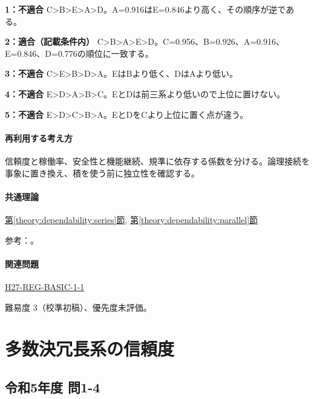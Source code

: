 \noindent\textbf{1：不適合} C>B>E>A>D。A=\allowbreak{}0.916はE=\allowbreak{}0.846より高く、その順序が逆である。\par

\noindent\textbf{2：適合（記載条件内）} C>B>A>E>D。C=\allowbreak{}0.956、B=\allowbreak{}0.926、A=\allowbreak{}0.916、E=\allowbreak{}0.846、D=\allowbreak{}0.776の順位に一致する。\par

\noindent\textbf{3：不適合} C>E>B>D>A。EはBより低く、DはAより低い。\par

\noindent\textbf{4：不適合} E>D>A>B>C。EとDは前三系より低いので上位に置けない。\par

\noindent\textbf{5：不適合} E>D>C>B>A。EとDをCより上位に置く点が違う。\par

\paragraph{再利用する考え方} 信頼度と稼働率、安全性と機能継続、規準に依存する係数を分ける。論理接続を事象に置き換え、積を使う前に独立性を確認する。

\paragraph{共通理論} \hyperref[theory:dependability:series]{第\ref*{theory:dependability:series}節}, \hyperref[theory:dependability:parallel]{第\ref*{theory:dependability:parallel}節}

\par 参考：\cite{reliability_nist_series,reliability_nist_parallel}。

\paragraph{関連問題} \hyperref[q:h27-reg-basic-1-1]{H27-REG-BASIC-1-1}

\par 難易度 3（校準初稿）、優先度未評価。

\section{多数決冗長系の信頼度}

\subsection{令和5年度 問1-4}
\label{q:r05-reg-basic-1-4}

